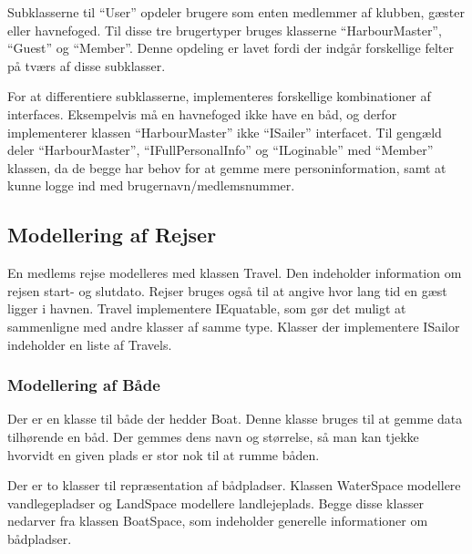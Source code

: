 Subklasserne til \enquote{User} opdeler brugere som enten medlemmer af klubben, gæster eller havnefoged. Til disse tre brugertyper bruges klasserne \enquote{HarbourMaster}, \enquote{Guest} og \enquote{Member}. Denne opdeling er lavet fordi der indgår forskellige felter på tværs af disse subklasser. 

For at differentiere subklasserne, implementeres forskellige kombinationer af interfaces. Eksempelvis må en havnefoged ikke have en båd, og derfor implementerer klassen \enquote{HarbourMaster} ikke \enquote{ISailer} interfacet. Til gengæld deler \enquote{HarbourMaster}, \enquote{IFullPersonalInfo} og \enquote{ILoginable} med \enquote{Member} klassen, da de begge har behov for at gemme mere personinformation, samt at kunne logge ind med brugernavn/medlemsnummer.

\subsection{Modellering af Rejser}
\label{sub:rejser}

En medlems rejse modelleres med klassen Travel. Den indeholder information om rejsen start- og slutdato. Rejser bruges også til at angive hvor lang tid en gæst ligger i havnen. Travel implementere IEquatable, som gør det muligt at sammenligne med andre klasser af samme type. Klasser der implementere ISailor indeholder en liste af Travels.

\subsubsection{Modellering af Både}
\label{sub:bade}

Der er en klasse til både der hedder Boat. Denne klasse bruges til at gemme data tilhørende en båd. Der gemmes dens navn og størrelse, så man kan tjekke hvorvidt en given plads er stor nok til at rumme båden.

Der er to klasser til repræsentation af bådpladser. Klassen WaterSpace modellere vandlegepladser og LandSpace modellere landlejeplads. Begge disse klasser nedarver fra klassen BoatSpace, som indeholder generelle informationer om bådpladser.

